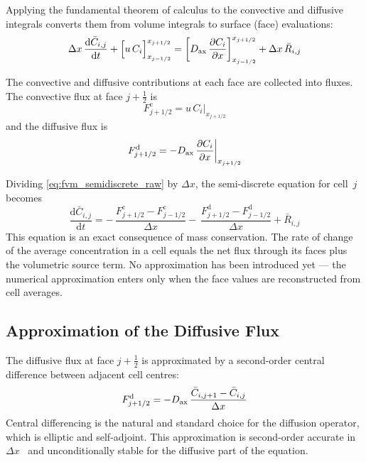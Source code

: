 Applying the fundamental theorem of calculus to the convective and diffusive integrals converts them from volume integrals to surface (face) evaluations:
%
\begin{equation}
  \Delta x\,\frac{\mathrm{d}\bar{C}_{i,j}}{\mathrm{d}t}
  + {\Bigl[u\,C_i\Bigr]}_{x_{j-1/2}}^{x_{j+1/2}}
  = {\biggl[D_{\mathrm{ax}}\,
    \frac{\partial C_i}{\partial x}\biggr]}_{x_{j-1/2}}^{x_{j+1/2}}
  + \Delta x\,\bar{R}_{i,j}
  \label{eq:fvm_semidiscrete_raw}
\end{equation}

The convective and diffusive contributions at each face are collected into fluxes. The convective flux at face \(j + \tfrac{1}{2}\) is
%
\begin{equation}
  F^{\mathrm{c}}_{j+1/2} = u\,C_i\big|_{x_{j+1/2}}
  \label{eq:convective_flux}
\end{equation}
%
and the diffusive flux is
%
\begin{equation}
  F^{\mathrm{d}}_{j+1/2}
  = -D_{\mathrm{ax}}\,
    \frac{\partial C_i}{\partial x}\bigg|_{x_{j+1/2}}
  \label{eq:diffusive_flux}
\end{equation}

Dividing \cref{eq:fvm_semidiscrete_raw} by \(\Delta x\), the semi-discrete equation for cell~\(j\) becomes
%
\begin{equation}
  \frac{\mathrm{d}\bar{C}_{i,j}}{\mathrm{d}t}
  = -\,\frac{F^{\mathrm{c}}_{j+1/2} - F^{\mathrm{c}}_{j-1/2}}{\Delta x}
    -\,\frac{F^{\mathrm{d}}_{j+1/2} - F^{\mathrm{d}}_{j-1/2}}{\Delta x}
    + \bar{R}_{i,j}
  \label{eq:fvm_semidiscrete}
\end{equation}
%
This equation is an exact consequence of mass conservation. The rate of change of the average concentration in a cell equals the net flux through its faces plus the volumetric source term. No approximation has been introduced yet --- the numerical approximation enters only when the face values are reconstructed from cell averages.

\subsection{Approximation of the Diffusive Flux}\label{ssec:diffusive_flux}

The diffusive flux at face \(j + \tfrac{1}{2}\) is approximated by a second-order central difference between adjacent cell centres:
%
\begin{equation}
  F^{\mathrm{d}}_{j+1/2}
  = -D_{\mathrm{ax}}\,
    \frac{\bar{C}_{i,j+1} - \bar{C}_{i,j}}{\Delta x}
  \label{eq:diffusive_flux_approx}
\end{equation}
%
Central differencing is the natural and standard choice for the diffusion operator, which is elliptic and self-adjoint. This approximation is second-order accurate in~\(\Delta x\)~\cite{Versteeg2007, LeVeque2002} and unconditionally stable for the diffusive part of the equation.

